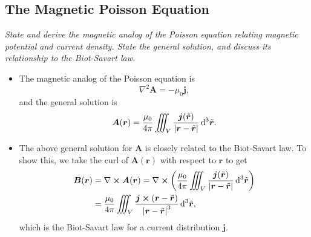\documentclass[11pt, a4paper]{article}
\newcommand{\diff}{\mathop{}\!\mathrm{d}} %
\newcommand{\dtr}{\diff^{3} \tilde{\r}}  %
\renewcommand{\vec}[1]{\bm{#1}} %
\renewcommand{\t}[1]{\tilde{#1}} %
\renewcommand{\r}{\vec{r}}
\newcommand{\B}{\vec{B}} %
\newcommand{\A}{\vec{A}} %
\newcommand{\mm}{\mu_{0}}  %
\renewcommand{\j}{\vec{j}}  %
\renewcommand{\curl}{\nabla \cross}
\renewcommand{\laplacian}{\nabla^{2}}
\begin{document}
\subsection{The Magnetic Poisson Equation}
\textit{State and derive the magnetic analog of the Poisson equation relating magnetic potential and current density. State the general solution, and discuss its relationship to the Biot-Savart law.}

\begin{itemize}

    \item The magnetic analog of the Poisson equation is
    \begin{equation*}
        \laplacian \A = - \mm \j,
    \end{equation*}
    and the general solution is
    \begin{equation*}
        \A(\r) = \frac{\mm}{4\pi}\iiint_{V} \frac{\j(\tilde{\r})}{\abs{\r - \tilde{\r}}} \dtr.
    \end{equation*}
    
	\item The above general solution for $ \A $ is closely related to the Biot-Savart law. To show this, we take the curl of $ \A(\r) $ with respect to $ \r $ to get
	\begin{align*}
		\B(\r) &= \curl \A(\r) = \curl \left(\frac{\mm}{4\pi} \iiint_{V} \frac{\j(\t{\r})}{\abs{\r - \t{\r}}} \dtr\right)\\
		& = \frac{\mm}{4\pi} \iiint_{V} \frac{\j \cross (\r - \t{\r})}{\abs{\r - \t{\r}}^{3}} \dtr,
	\end{align*}
    which is the Biot-Savart law for a current distribution $ \j $. 

\end{itemize}
\end{document}
